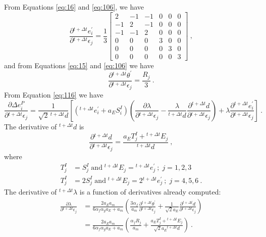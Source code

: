 From Equations \vref{eq:16} and \vref{eq:106}, we have
\begin{equation}
\frac{\partial\phantom{}^{t+\Delta t}e_{i}^{\prime}}{\partial\phantom{}^{t+\Delta t}\epsilon_{j}}=\frac{1}{3}\left[\begin{array}{cccccc}
2 & -1 & -1 & 0 & 0 & 0\\
-1 & 2 & -1 & 0 & 0 & 0\\
-1 & -1 & 2 & 0 & 0 & 0\\
0 & 0 & 0 & 3 & 0 & 0\\
0 & 0 & 0 & 0 & 3 & 0\\
0 & 0 & 0 & 0 & 0 & 3
\end{array}\right]\:,\label{eq:120}
\end{equation}
and from Equations \vref{eq:15} and \vref{eq:106} we have
\begin{equation}
\frac{\partial\phantom{}^{t+\Delta t}\theta^{\prime}}{\partial\phantom{}^{t+\Delta t}\epsilon_{j}}=\frac{R_{j}}{3}\:.\label{eq:121}
\end{equation}
From Equation \vref{eq:116} we have
\begin{equation}
\frac{\partial\Delta e_{i}^{P}}{\partial\phantom{}^{t+\Delta t}\epsilon_{j}}=\frac{1}{\sqrt{2}\,\phantom{}^{t+\Delta t}d}\left[\left(^{t+\Delta t}e_{i}^{\prime}+a_{E}S_{i}^{I}\right)\left(\frac{\partial\lambda}{\partial\phantom{}^{t+\Delta t}\epsilon_{j}}-\frac{\lambda}{\phantom{}^{t+\Delta t}d}\frac{\partial\phantom{}^{t+\Delta t}d}{\partial\phantom{}^{t+\Delta t}\epsilon_{j}}\right)+\lambda\frac{\partial\phantom{}^{t+\Delta t}e_{i}^{\prime}}{\partial\phantom{}^{t+\Delta t}\epsilon_{j}}\right]\:.\label{eq:122}
\end{equation}
The derivative of $^{t+\Delta t}d$ is
\begin{equation}
\frac{\partial\phantom{}^{t+\Delta t}d}{\partial\phantom{}^{t+\Delta t}\epsilon_{j}}=\frac{a_{E}T_{j}^{I}+\phantom{}^{t+\Delta t}E_{j}}{\phantom{}^{t+\Delta t}d}\:,\label{eq:123}
\end{equation}
where
\begin{align}
T_{j}^{I} & =S_{j}^{I}\;\mathrm{and}\;\phantom{}^{t+\Delta t}E_{j}=\phantom{}^{t+\Delta t}e_{j}^{\prime}\:;\; j=1,2,3\nonumber \\
T_{j}^{I} & =2S_{j}^{I}\;\mathrm{and}\;\phantom{}^{t+\Delta t}E_{j}=2\phantom{}^{t+\Delta t}e_{j}^{\prime}\:;\; j=4,5,6\:.\label{eq:124}
\end{align}
The derivative of $^{t+\Delta t}\lambda$ is a function of derivatives
already computed:
\begin{align}
\frac{\partial\lambda}{\partial\phantom{}^{t+\Delta t}\epsilon_{j}} & =\frac{2a_{E}a_{m}}{6\alpha_{f}\alpha_{g}a_{E}+a_{m}}\left(\frac{3\alpha_{f}}{a_{m}}\frac{\partial\phantom{}^{t+\Delta t}\theta^{\prime}}{\partial\phantom{}^{t+\Delta t}\epsilon_{j}}+\frac{1}{\sqrt{2}a_{E}}\frac{\partial\phantom{}^{t+\Delta t}d}{\partial\phantom{}^{t+\Delta t}\epsilon_{j}}\right)\nonumber \\
 & =\frac{2a_{E}a_{m}}{6\alpha_{f}\alpha_{g}a_{E}+a_{m}}\left(\frac{\alpha_{f}R_{j}}{a_{m}}+\frac{a_{E}T_{j}^{I}+\phantom{}^{t+\Delta t}E_{j}}{\sqrt{2}a_{E}\phantom{}^{t+\Delta t}d}\right)\:.\label{eq:125}
\end{align}
